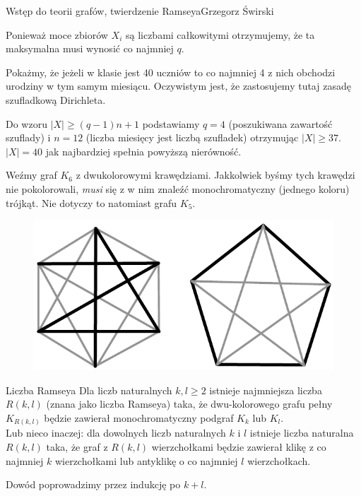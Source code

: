 \begin{referat}{Wstęp do teorii grafów, twierdzenie Ramseya}{Grzegorz Świrski}
\begin{teoria}
\begin{dowod}
Ponieważ moce zbiorów $X_{i}$ są liczbami całkowitymi otrzymujemy, że ta maksymalna musi wynosić co najmniej $q$.
\end{dowod}

Pokażmy, że jeżeli w klasie jest 40 uczniów to co najmniej 4 z nich obchodzi urodziny w tym samym miesiącu. Oczywistym jest, że zastosujemy tutaj zasadę szufladkową Dirichleta.

Do wzoru $|X| \geq (q-1)n + 1$ podstawiamy $q = 4$ (poszukiwana zawartość szuflady) i $n = 12$ (liczba miesięcy jest liczbą szufladek) otrzymując $|X| \geq 37$. $|X| = 40$ jak najbardziej spełnia powyższą nierówność.


Weźmy graf $K_{6}$ z dwukolorowymi krawędziami. Jakkolwiek byśmy tych krawędzi nie pokolorowali, \emph{musi} się z w nim znaleźć monochromatyczny (jednego koloru) trójkąt. Nie dotyczy to natomiast grafu $K_{5}$.
\begin{figure}[h]
 \centering
 \includegraphics[scale=0.6]{./swirski/ramsey_example.pdf}
\end{figure}

\begin{twierdzenie}{Liczba Ramseya}
Dla liczb naturalnych $k,l \geq 2$ istnieje najmniejsza liczba $R\left(k,l\right)$ (znana jako liczba Ramseya) taka, że dwu-kolorowego grafu pełny $K_{R\left(k,l\right)}$ będzie zawierał monochromatyczny podgraf $K_{k}$ lub $K_{l}$.\\
Lub nieco inaczej: dla dowolnych liczb naturalnych $k$ i $l$ istnieje liczba naturalna $R\left(k,l\right)$ taka, że graf z $R\left(k, l\right)$ wierzchołkami będzie zawierał klikę z co najmniej $k$ wierzchołkami lub antyklikę o co najmniej $l$ wierzchołkach.
\end{twierdzenie}

\begin{dowod}
Dowód poprowadzimy przez indukcję po $k+l$.


\end{dowod}
\end{teoria}
\end{referat}
